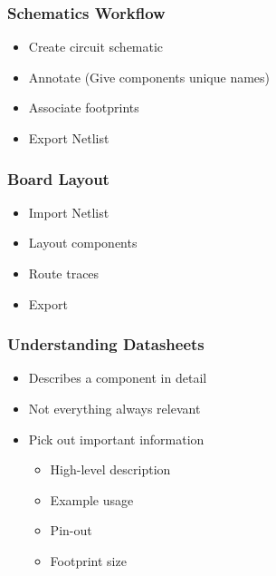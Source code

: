\documentclass{beamer}
\begin{document}
\begin{frame}
  \frametitle{Schematics Workflow}
  \begin{itemize}
    \item Create circuit schematic
    \item Annotate (Give components unique names)
    \item Associate footprints
    \item Export Netlist
  \end{itemize}
\end{frame}


\begin{frame}
  \frametitle{Board Layout}
  \begin{itemize}
    \item Import Netlist
    \item Layout components
    \item Route traces
    \item Export
  \end{itemize}
\end{frame}


\begin{frame}
  \frametitle{Understanding Datasheets}
  \begin{itemize}
    \item Describes a component in detail
    \item Not everything always relevant
    \item Pick out important information
    \begin{itemize}
      \item High-level description
      \item Example usage
      \item Pin-out
      \item Footprint size
    \end{itemize}
  \end{itemize}
\end{frame}
\end{document}
